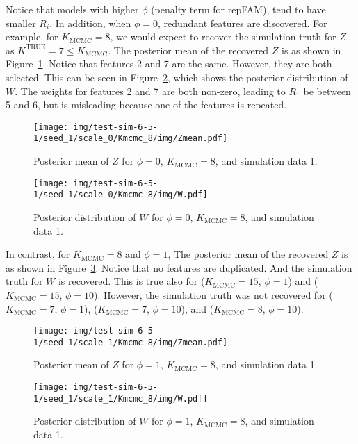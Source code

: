 \documentclass[12pt]{article} %
\def\true{\text{TRUE}}
\begin{document}
Notice that models with higher $\phi$ (penalty term for repFAM), tend to have
smaller $R_i$. In addition, when $\phi=0$, redundant features are discovered.
For example, for $K_\text{MCMC} = 8$, we would expect to recover the simulation
truth for $Z$ as $K^\true = 7 \le K_\text{MCMC}$. The posterior mean of the
recovered $Z$ is as shown in Figure~\ref{fig:kmcmc8-scale0-zmean}. Notice that
features 2 and 7 are the same.  However, they are both selected. This can be seen
in Figure~\ref{fig:kmcmc8-scale0-w}, which shows the posterior distribution of $W$.
The weights for features 2 and 7 are both non-zero, leading to $R_1$ be between
5 and 6, but is misleading because one of the features is repeated.

\begin{figure}[h]
  \begin{center}
    \texttt{[image: img/test-sim-6-5-1/seed\_1/scale\_0/Kmcmc\_8/img/Zmean.pdf]}
  \end{center}
  \caption{Posterior mean of $Z$ for $\phi=0$, $K_\text{MCMC}=8$, and
  simulation data 1.}
  \label{fig:kmcmc8-scale0-zmean}
\end{figure}

\begin{figure}[h]
  \begin{center}
    \texttt{[image: img/test-sim-6-5-1/seed\_1/scale\_0/Kmcmc\_8/img/W.pdf]}
  \end{center}
  \caption{Posterior distribution of $W$ for $\phi=0$, $K_\text{MCMC}=8$, and
  simulation data 1.}
  \label{fig:kmcmc8-scale0-w}
\end{figure}

In contrast, for $K_\text{MCMC} = 8$ and $\phi=1$, The posterior mean of the
recovered $Z$ is as shown in Figure~\ref{fig:kmcmc8-scale1-zmean}. Notice that
no features are duplicated.  And the simulation truth for $W$ is recovered.
This is true also for ($K_\text{MCMC}=15$, $\phi=1$) and ($K_\text{MCMC}=15$,
$\phi=10$).  However, the simulation truth was not recovered for
($K_\text{MCMC}=7$, $\phi=1$), ($K_\text{MCMC}=7$, $\phi=10$), and
($K_\text{MCMC}=8$, $\phi=10$).

\begin{figure}[h]
  \begin{center}
    \texttt{[image: img/test-sim-6-5-1/seed\_1/scale\_1/Kmcmc\_8/img/Zmean.pdf]}
  \end{center}
  \caption{Posterior mean of $Z$ for $\phi=1$, $K_\text{MCMC}=8$, and
  simulation data 1.}
  \label{fig:kmcmc8-scale1-zmean}
\end{figure}

\begin{figure}[h]
  \begin{center}
    \texttt{[image: img/test-sim-6-5-1/seed\_1/scale\_1/Kmcmc\_8/img/W.pdf]}
  \end{center}
  \caption{Posterior distribution of $W$ for $\phi=1$, $K_\text{MCMC}=8$, and
  simulation data 1.}
  \label{fig:kmcmc8-scale1-w}
\end{figure}
\end{document}
